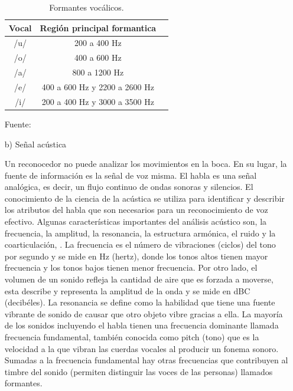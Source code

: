 \begin{enumerate}
\begin{center}
\begin{table}[h!]
\centering
\caption{\small{Formantes vocálicos.}}
\label{table:tabla2.2}
\vskip 0.1cm
\begin{tabular}{|c|c|c|}
\hline
{\small Vocal} & {\small Región principal formantica}\\ 
\hline 
{\small /u/} & {\small 200 a 400 Hz}\\ 
\hline 
{\small /o/} & {\small 400 a 600 Hz}\\ 
\hline 
{\small /a/} & {\small 800 a 1200 Hz}\\ 
\hline 
{\small /e/} & {\small 400 a 600 Hz y 2200 a 2600 Hz}\\ 
\hline 
{\small /i/} & {\small 200 a 400 Hz y 3000 a 3500 Hz}\\ 
\hline 
\end{tabular} 
\begin{center}
\vskip 0.2cm
{\small{Fuente: \cite{wikipedia1}}}
\end{center}
\end{table}
\end{center}

\item[b)]Señal acústica
\par
Un reconocedor no puede analizar los movimientos en la boca. En su lugar, la fuente de información es la señal de voz misma. El habla es una señal analógica, es decir, un flujo continuo de ondas sonoras y silencios. El conocimiento de la ciencia de la acústica se utiliza para identificar y describir los atributos del habla que son necesarios para un reconocimiento de voz efectivo. Algunas características importantes del análisis acústico son, la frecuencia, la amplitud, la resonancia, la estructura armónica, el ruido y la coarticulación, \cite{luis}.
\vskip 0.5cm
La frecuencia es el número de vibraciones (ciclos) del tono por segundo y se mide en Hz (hertz), donde los tonos altos tienen mayor frecuencia y los tonos bajos tienen menor frecuencia. Por otro lado, el volumen de un sonido refleja la cantidad de aire que es forzada a moverse, esta describe y representa la amplitud de la onda y se mide en dBC (decibéles).
\vskip 0.5cm
La resonancia se define como la habilidad que tiene una fuente vibrante de sonido de causar que otro objeto vibre gracias a ella. La mayoría de los sonidos incluyendo el habla tienen una frecuencia dominante llamada frecuencia fundamental, también conocida como pitch (tono) que es la velocidad a la que vibran las cuerdas vocales al producir un fonema sonoro. Sumadas a la frecuencia fundamental hay otras frecuencias que contribuyen al timbre del sonido (permiten distinguir las voces de las personas) llamados formantes.


\end{enumerate}
